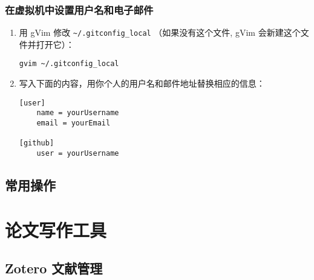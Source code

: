 \documentclass[
    11pt,
    base=hide,
    cite=authoryear,
    device=phone,
    lang=cn,
    mode=simple,
    result=answer,
    toc=onecol,
]{elegantsierxue310}
\begin{document}
\subsection{在虚拟机中设置用户名和电子邮件}%
\label{sub:git-user-info}

\begin{enumerate}
    \item 用 gVim 修改 \lstinline{~/.gitconfig_local}
        （如果没有这个文件, gVim 会新建这个文件并打开它）：
\begin{lstlisting}[style=lst]
gvim ~/.gitconfig_local
\end{lstlisting}
    \item 写入下面的内容，用你个人的用户名和邮件地址替换相应的信息：
\begin{lstlisting}[style=lst]
[user]
	name = yourUsername
	email = yourEmail

[github]
	user = yourUsername
\end{lstlisting}
\end{enumerate}

%
%
%
%
\newpage
\section{常用操作}%
\label{sec:git-tips}
%

\chapter{论文写作工具}%
\label{cha:tools-writing}

\section{Zotero 文献管理}%
\label{sec:citation-zotero}

\newpage



%

\appendix



\printindex
\printglossary[title={术语表}]
\end{document}
